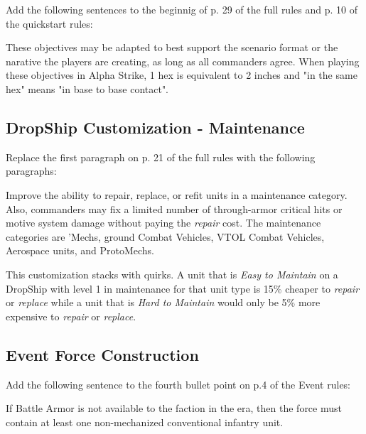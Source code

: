 Add the following sentences to the beginnig of p. 29 of the full rules and p. 10 of the quickstart rules:

These objectives may be adapted to best support the scenario format or the narative the players are creating, as long as all commanders agree.
When playing these objectives in Alpha Strike, 1 hex is equivalent to 2 inches and "in the same hex" means "in base to base contact".

\subsection{DropShip Customization - Maintenance}

Replace the first paragraph on p. 21 of the full rules with the following paragraphs:

Improve the ability to repair, replace, or refit units in a maintenance category.
Also, commanders may fix a limited number of through-armor critical hits or motive system damage without paying the \emph{repair} cost.
The maintenance categories are 'Mechs, ground Combat Vehicles, VTOL Combat Vehicles, Aerospace units, and ProtoMechs.

This customization stacks with quirks.
A unit that is \emph{Easy to Maintain} on a DropShip with level 1 in maintenance for that unit type is 15\% cheaper to \emph{repair} or \emph{replace} while a unit that is \emph{Hard to Maintain} would only be 5\% more expensive to \emph{repair} or \emph{replace}.

\subsection{Event Force Construction}

Add the following sentence to the fourth bullet point on p.4 of the Event rules:

If Battle Armor is not available to the faction in the era, then the force must contain at least one non-mechanized conventional infantry unit.
